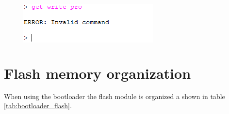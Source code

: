 \begin{figure}[H]
    \centering
    \includegraphics[width=.4\linewidth]{images/bootloader_cmd_err.png}
    \label{fig:bootloader_cmd_err}
\end{figure}

\section{Flash memory organization}

When using the bootloader the flash module is organized a shown in table \ref{tab:bootloader_flash}. 

